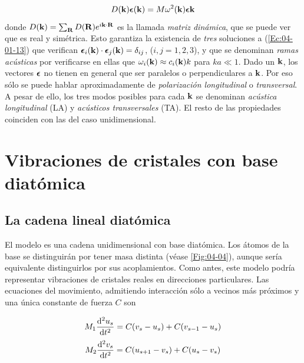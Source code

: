\begin{equation}
	D(\mathbf{k}) \boldsymbol{\epsilon} (\mathbf{k}) = M \omega^2 (\mathbf{k}) \boldsymbol{\epsilon} \mathbf{k} \label{Ec:04-01-13}
\end{equation}
donde $D(\mathbf{k}) = \sum_{\mathbf{R}} D(\mathbf{R}) e^{i \mathbf{k} \cdot \mathbf{R}}$ es la llamada \textit{matriz dinámica}, que se puede ver que es real y simétrica. Esto garantiza la existencia de \textit{tres} soluciones a (\ref{Ec:04-01-13}) que verifican $\boldsymbol{\epsilon}_i (\mathbf{k}) \cdot \boldsymbol{\epsilon}_j (\mathbf{k}) = \delta_{ij}$, ($i,j=1,2,3$), y que se denominan \textit{ramas acústicas} por verificarse en ellas que $\omega_i (\mathbf{k}) \approx c_i (\mathbf{k})k$ para $ka\ll 1$. Dado un $\mathbf{k}$, los vectores $\boldsymbol{\epsilon}$ no tienen en general que ser paralelos o perpendiculares a $\mathbf{k}$. Por eso sólo se puede hablar aproximadamente de \textit{polarización longitudinal} o \textit{transversal}. A pesar de ello, los tres modos posibles para cada $\mathbf{k}$ se denominan \textit{acústica longitudinal} (LA) y \textit{acústicos transversales} (TA). El resto de las propiedades coinciden con las del caso unidimensional.

\section{Vibraciones de cristales con base diatómica}

\subsection{La cadena lineal diatómica}

El modelo es una cadena unidimensional con base diatómica. Los átomos de la base se distinguirán por tener masa distinta (véase \ref{Fig:04-04}), aunque sería equivalente distinguirlos por sus acoplamientos. Como antes, este modelo podría representar vibraciones de cristales reales en direcciones particulares. Las ecuaciones del movimiento, admitiendo interacción sólo a vecinos más próximos y una única constante de fuerza $C$ son

\begin{equation*}
	M_1 \frac{\mathrm{d} ^2 u_s}{\mathrm{d} t^2} = C(v_s - u_s) + C(v_{s-1}-u_s)
\end{equation*}
\begin{equation}
	M_2 \frac{\mathrm{d} ^2 v_s}{\mathrm{d} t^2} = C(u_{s+1} - v_s) + C(u_{s}-v_s) \label{Ec:04-02-01}
\end{equation}

